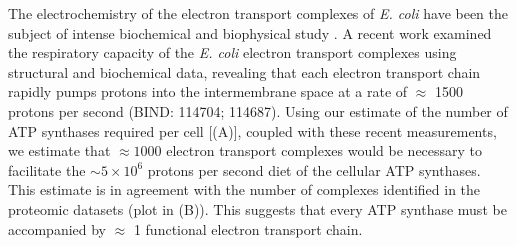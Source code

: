 
The electrochemistry of the electron transport complexes of \textit{E. coli}
have been the subject of intense biochemical and biophysical study
\citep{ingledew1984, khademian2017,cox1970,henkel2014}. A recent work
\citep{szenk2017} examined the respiratory capacity of the \textit{E. coli}
electron transport complexes using structural and biochemical data, revealing
that each electron transport chain rapidly pumps protons into the
intermembrane space at a rate of $\approx$ 1500 protons per second (BIND:
114704; 114687). Using our estimate of the number of ATP synthases required
per cell [(A)], coupled with these recent
measurements, we estimate that $\approx 1000$ electron transport complexes
would be necessary to facilitate the $\sim 5 \times 10^6$ protons per second
diet of the cellular ATP synthases. This estimate is in agreement with the
number of complexes identified in the proteomic datasets (plot in
(B)). This suggests that every ATP synthase must be
accompanied by $\approx$ 1 functional electron transport chain.



